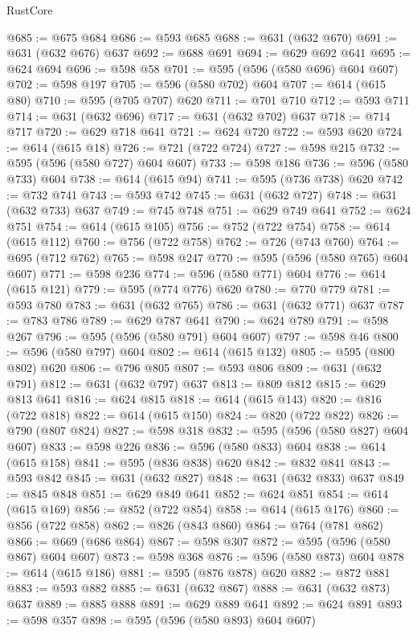 \begin{lexlean}{RustCore}
\begin{coremodule}
@685 := @675 @684
@686 := @593 @685
@688 := @631 (@632 @670)
@691 := @631 (@632 @676) @637
@692 := @688 @691
@694 := @629 @692 @641
@695 := @624 @694
@696 := @598 @58
@701 := @595 (@596 (@580 @696) @604 @607)
@702 := @598 @197
@705 := @596 (@580 @702) @604
@707 := @614 (@615 @80)
@710 := @595 (@705 @707) @620
@711 := @701 @710
@712 := @593 @711
@714 := @631 (@632 @696)
@717 := @631 (@632 @702) @637
@718 := @714 @717
@720 := @629 @718 @641
@721 := @624 @720
@722 := @593 @620
@724 := @614 (@615 @18)
@726 := @721 (@722 @724)
@727 := @598 @215
@732 := @595 (@596 (@580 @727) @604 @607)
@733 := @598 @186
@736 := @596 (@580 @733) @604
@738 := @614 (@615 @94)
@741 := @595 (@736 @738) @620
@742 := @732 @741
@743 := @593 @742
@745 := @631 (@632 @727)
@748 := @631 (@632 @733) @637
@749 := @745 @748
@751 := @629 @749 @641
@752 := @624 @751
@754 := @614 (@615 @105)
@756 := @752 (@722 @754)
@758 := @614 (@615 @112)
@760 := @756 (@722 @758)
@762 := @726 (@743 @760)
@764 := @695 (@712 @762)
@765 := @598 @247
@770 := @595 (@596 (@580 @765) @604 @607)
@771 := @598 @236
@774 := @596 (@580 @771) @604
@776 := @614 (@615 @121)
@779 := @595 (@774 @776) @620
@780 := @770 @779
@781 := @593 @780
@783 := @631 (@632 @765)
@786 := @631 (@632 @771) @637
@787 := @783 @786
@789 := @629 @787 @641
@790 := @624 @789
@791 := @598 @267
@796 := @595 (@596 (@580 @791) @604 @607)
@797 := @598 @46
@800 := @596 (@580 @797) @604
@802 := @614 (@615 @132)
@805 := @595 (@800 @802) @620
@806 := @796 @805
@807 := @593 @806
@809 := @631 (@632 @791)
@812 := @631 (@632 @797) @637
@813 := @809 @812
@815 := @629 @813 @641
@816 := @624 @815
@818 := @614 (@615 @143)
@820 := @816 (@722 @818)
@822 := @614 (@615 @150)
@824 := @820 (@722 @822)
@826 := @790 (@807 @824)
@827 := @598 @318
@832 := @595 (@596 (@580 @827) @604 @607)
@833 := @598 @226
@836 := @596 (@580 @833) @604
@838 := @614 (@615 @158)
@841 := @595 (@836 @838) @620
@842 := @832 @841
@843 := @593 @842
@845 := @631 (@632 @827)
@848 := @631 (@632 @833) @637
@849 := @845 @848
@851 := @629 @849 @641
@852 := @624 @851
@854 := @614 (@615 @169)
@856 := @852 (@722 @854)
@858 := @614 (@615 @176)
@860 := @856 (@722 @858)
@862 := @826 (@843 @860)
@864 := @764 (@781 @862)
@866 := @669 (@686 @864)
@867 := @598 @307
@872 := @595 (@596 (@580 @867) @604 @607)
@873 := @598 @368
@876 := @596 (@580 @873) @604
@878 := @614 (@615 @186)
@881 := @595 (@876 @878) @620
@882 := @872 @881
@883 := @593 @882
@885 := @631 (@632 @867)
@888 := @631 (@632 @873) @637
@889 := @885 @888
@891 := @629 @889 @641
@892 := @624 @891
@893 := @598 @357
@898 := @595 (@596 (@580 @893) @604 @607)

\end{coremodule}
\end{lexlean}

